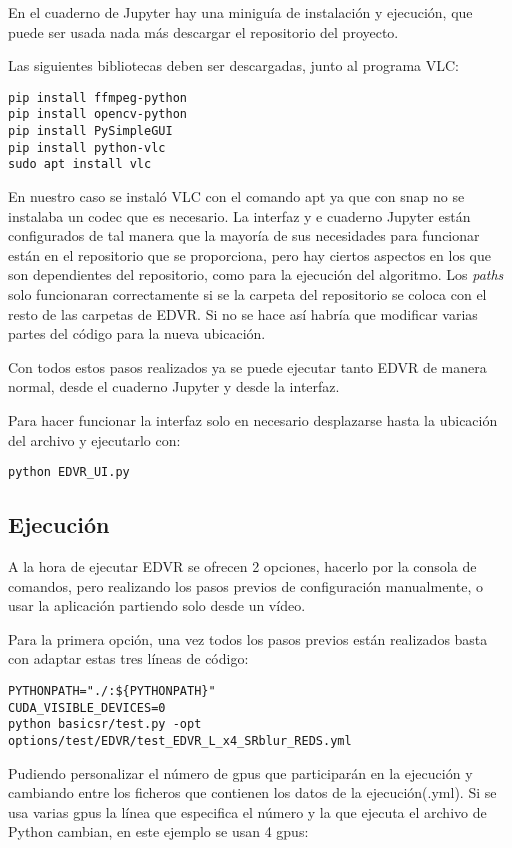 En el cuaderno de Jupyter hay una miniguía de instalación y ejecución, que puede ser usada nada más descargar el repositorio del proyecto.

Las siguientes bibliotecas deben ser descargadas, junto al programa VLC:

\begin{verbatim}
pip install ffmpeg-python
pip install opencv-python
pip install PySimpleGUI
pip install python-vlc
sudo apt install vlc
\end{verbatim}

En nuestro caso se instaló VLC con el comando apt ya que con snap no se instalaba un codec que es necesario. La interfaz y e cuaderno Jupyter están configurados de tal manera que la mayoría de sus necesidades para funcionar están en el repositorio que se proporciona, pero hay ciertos aspectos en los que son dependientes del repositorio, como para la ejecución del algoritmo. Los \emph{paths} solo funcionaran correctamente si se la carpeta del repositorio se coloca con el resto de las carpetas de EDVR. Si no se hace así habría que modificar varias partes del código para la nueva ubicación. 

Con todos estos pasos realizados ya se puede ejecutar tanto EDVR de manera normal, desde el cuaderno Jupyter y desde la interfaz.

Para hacer funcionar la interfaz solo en necesario desplazarse hasta la ubicación del archivo y ejecutarlo con:
\begin{verbatim}
python EDVR_UI.py
\end{verbatim}

\subsection{Ejecución}
A la hora de ejecutar EDVR se ofrecen 2 opciones, hacerlo por la consola de comandos, pero realizando los pasos previos de configuración manualmente, o usar la aplicación partiendo solo desde un vídeo.

Para la primera opción, una vez todos los pasos previos están realizados basta con adaptar estas tres líneas de código:

\begin{verbatim}
PYTHONPATH="./:${PYTHONPATH}"
CUDA_VISIBLE_DEVICES=0
python basicsr/test.py -opt options/test/EDVR/test_EDVR_L_x4_SRblur_REDS.yml
\end{verbatim}

Pudiendo personalizar el número de gpus que participarán en la ejecución y cambiando entre los ficheros que contienen los datos de la ejecución(.yml).
Si se usa varias gpus la línea que especifica el número y la que ejecuta el archivo de Python cambian, en este ejemplo se usan 4 gpus:


